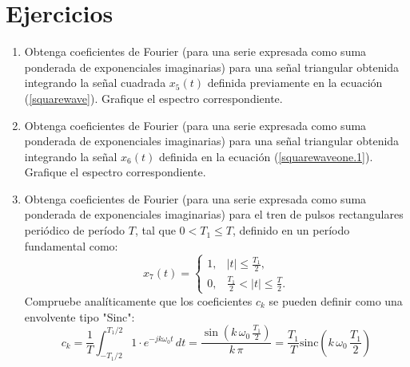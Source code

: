 \section{Ejercicios}


\begin{enumerate}
	\item Obtenga coeficientes de Fourier (para una serie expresada como suma ponderada de exponenciales imaginarias) para una señal triangular obtenida integrando la señal cuadrada $x_{5}(t)$ definida previamente en la ecuación (\ref{squarewave}). Grafique el espectro correspondiente.
	
	\item Obtenga coeficientes de Fourier (para una serie expresada como suma ponderada de exponenciales imaginarias) para una señal triangular obtenida integrando la señal $x_{6}(t)$ definida en la ecuación (\ref{squarewaveone.1}). Grafique el espectro correspondiente.
	
	\item Obtenga coeficientes de Fourier (para una serie expresada como suma ponderada de exponenciales imaginarias) para el tren de pulsos rectangulares periódico de período $T$, tal que $0 < T_{1} \leq T$, definido en un período fundamental como:
	\begin{equation}
		x_{7}(t) = \begin{cases}
			1, & |t| \leq \frac{T_{1}}{2}, \\
			0, & \frac{T_{1}}{2} < |t| \leq \frac{T}{2}.
		\end{cases}
	\end{equation}
	Compruebe analíticamente que los coeficientes $c_k$ se pueden definir como una envolvente tipo "Sinc":
	\begin{equation}
		c_{k} = \frac{1}{T} \int_{-T_1/2}^{T_1/2} 1 \cdot e^{-j k \omega_0 t} \, dt = \frac{\sin\left(k \, \omega_0 \, \frac{T_{1}}{2}\right)}{k \, \pi} = \frac{T_1}{T} \text{sinc}\left(k \, \omega_0 \, \frac{T_1}{2}\right)
	\end{equation}
\end{enumerate}